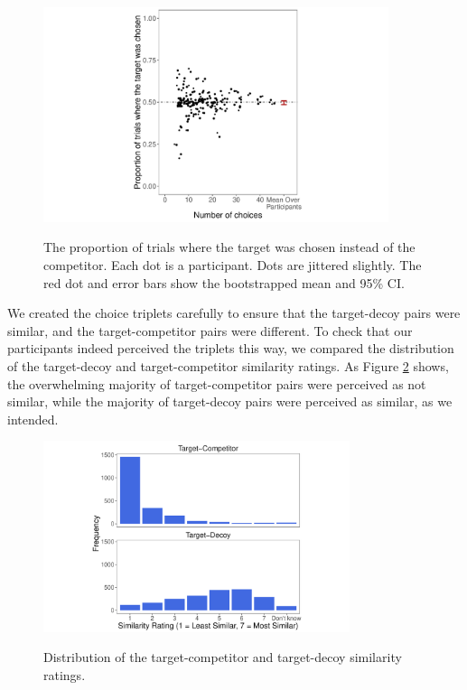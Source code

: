 \documentclass[12pt, a4paper]{article}
\begin{document}
\begin{figure}[htb!]
\centering
		\caption{The proportion of trials where the target was chosen instead of the competitor. Each dot is a participant. Dots are jittered slightly. The red dot and error bars show the bootstrapped mean and 95\% CI.}
\includegraphics[width=0.9\textwidth]{figure4.pdf}
\label{fig:exp2_res}
\end{figure}

We created the choice triplets carefully to ensure that the target-decoy pairs were similar, and the target-competitor pairs were different. To check that our participants indeed perceived the triplets this way, we compared the distribution of the target-decoy and target-competitor similarity ratings. As Figure \ref{fig:exp2_similarityratings} shows, the overwhelming majority of target-competitor pairs were perceived as not similar, while the majority of target-decoy pairs were perceived as similar, as we intended.

\begin{figure}[htb!]
\centering
		\caption{Distribution of the target-competitor and target-decoy similarity ratings.}
\includegraphics[width=0.8\textwidth]{Figure5.pdf}
\label{fig:exp2_similarityratings}
\end{figure}
\end{document}
